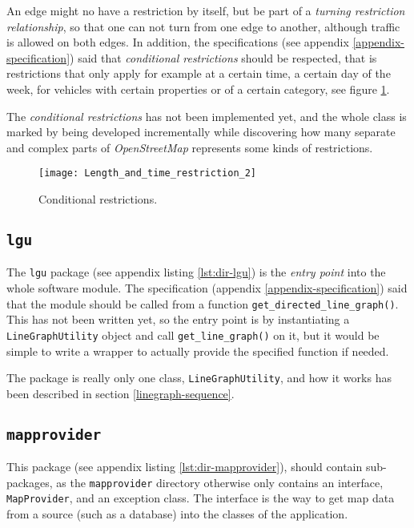 \documentclass[../main.tex]{subfiles}
\begin{document}
An edge might no have a restriction by itself, but be part of a \textit{turning restriction relationship}, so that one can not turn from one edge to another, although traffic is allowed on both edges. In addition, the specifications (see appendix \ref{appendix-specification}) said that \textit{conditional restrictions} should be respected, that is restrictions that only apply for example at a certain time, a certain day of the week, for vehicles with certain properties or of a certain category, see figure \ref{fig:conditional-restriction}. 

The \textit{conditional restrictions} has not been implemented yet, and the whole class is marked by being developed incrementally while discovering how many separate and complex parts of \textit{OpenStreetMap} represents some kinds of restrictions. 

\begin{figure}[H]
    \centering
    \texttt{[image: Length\_and\_time\_restriction\_2]}
    \caption{Conditional restrictions. \cite{img-conditional-restriction}}
    \label{fig:conditional-restriction}
\end{figure}


\subsection{\texttt{lgu}}
The \texttt{lgu} package (see appendix listing \ref{lst:dir-lgu}) is the \textit{entry point} into the whole software module. The specification (appendix \ref{appendix-specification}) said that the module should be called from a function \texttt{get\_directed\_line\_graph()}. This has not been written yet, so the entry point is by instantiating a \texttt{LineGraphUtility} object and call \texttt{get\_line\_graph()} on it, but it would be simple to write a wrapper to actually provide the specified function if needed.

The package is really only one class, \texttt{LineGraphUtility}, and how it works has been described in section \ref{linegraph-sequence}.

\subsection{\texttt{mapprovider}}
This package (see appendix listing \ref{lst:dir-mapprovider}), should contain sub-packages, as the \texttt{mapprovider} directory otherwise only contains an interface, \texttt{MapProvider}, and an exception class. The interface is the way to get map data from a source (such as a database) into the classes of the application.
\end{document}
